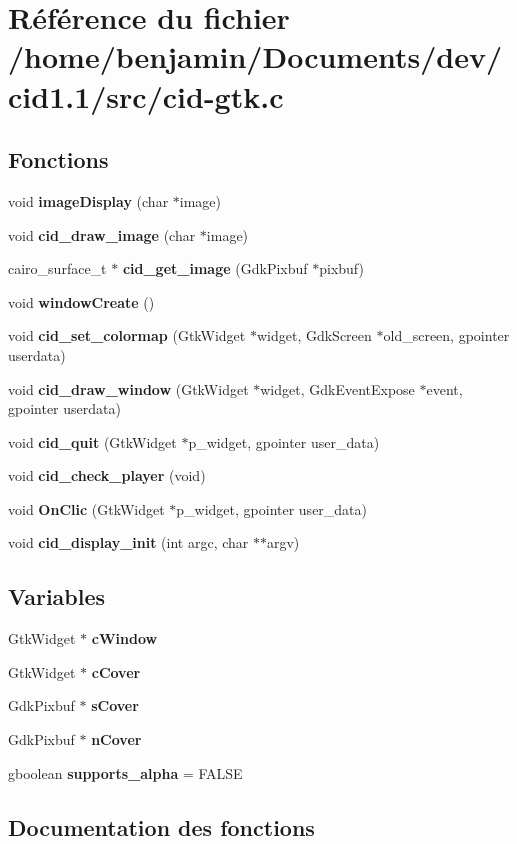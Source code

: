 \section{Référence du fichier /home/benjamin/Documents/dev/cid1.1/src/cid-gtk.c}
\label{cid-gtk_8c}
\subsection*{Fonctions}
\begin{CompactItemize}
\item 
void {\bf imageDisplay} (char $\ast$image)
\item 
void {\bf cid\_\-draw\_\-image} (char $\ast$image)
\item 
cairo\_\-surface\_\-t $\ast$ {\bf cid\_\-get\_\-image} (GdkPixbuf $\ast$pixbuf)
\item 
void {\bf windowCreate} ()
\item 
void {\bf cid\_\-set\_\-colormap} (GtkWidget $\ast$widget, GdkScreen $\ast$old\_\-screen, gpointer userdata)
\item 
void {\bf cid\_\-draw\_\-window} (GtkWidget $\ast$widget, GdkEventExpose $\ast$event, gpointer userdata)
\item 
void {\bf cid\_\-quit} (GtkWidget $\ast$p\_\-widget, gpointer user\_\-data)
\item 
void {\bf cid\_\-check\_\-player} (void)
\item 
void {\bf OnClic} (GtkWidget $\ast$p\_\-widget, gpointer user\_\-data)
\item 
void {\bf cid\_\-display\_\-init} (int argc, char $\ast$$\ast$argv)
\end{CompactItemize}
\subsection*{Variables}
\begin{CompactItemize}
\item 
GtkWidget $\ast$ {\bf cWindow}
\item 
GtkWidget $\ast$ {\bf cCover}
\item 
GdkPixbuf $\ast$ {\bf sCover}
\item 
GdkPixbuf $\ast$ {\bf nCover}
\item 
gboolean {\bf supports\_\-alpha} = FALSE
\end{CompactItemize}


\subsection{Documentation des fonctions}
